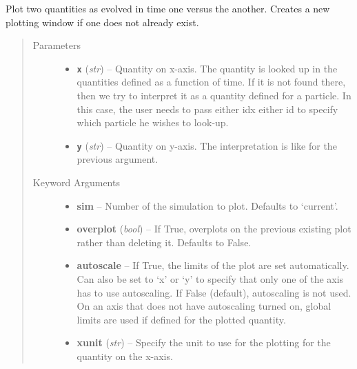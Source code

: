 \documentclass[letterpaper,10pt,english]{sphinxmanual}
\begin{document}

\begin{fulllineitems}
\label{index:facade.time_plot}
Plot two quantities as evolved in time one versus the another.  Creates
a new plotting window if one does not already exist.
\begin{quote}\begin{description}
\item[{Parameters}] \leavevmode\begin{itemize}
\item {} 
\textbf{\texttt{x}} (\emph{str}) -- Quantity on x-axis. The quantity is looked
up in the quantities defined as a function of time. If it is
not found there, then we try to interpret it as a quantity
defined for a particle. In this case, the user needs to pass
either idx either id to specify which particle he wishes
to look-up.

\item {} 
\textbf{\texttt{y}} (\emph{str}) -- Quantity on y-axis. The interpretation is
like for the previous argument.

\end{itemize}

\item[{Keyword Arguments}] \leavevmode\begin{itemize}
\item {} 
\textbf{sim} --
Number of the simulation to plot. Defaults to `current'.

\item {} 
\textbf{overplot} (\emph{bool}) --
If True, overplots on the previous existing plot rather
than deleting it. Defaults to False.

\item {} 
\textbf{autoscale} --
If True, the limits of the plot are set
automatically.  Can also be set to `x' or `y' to specify
that only one of the axis has to use autoscaling.
If False (default), autoscaling is not used. On an axis that
does not have autoscaling turned on, global limits are used
if defined for the plotted quantity.

\item {} 
\textbf{xunit} (\emph{str}) --
Specify the unit to use for the plotting for the quantity
on the x-axis.


\end{itemize}
\end{description}
\end{quote}
\end{fulllineitems}
\end{document}
